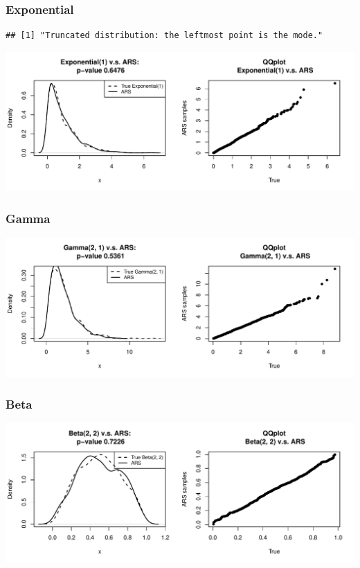 \documentclass{article}\usepackage[]{graphicx}\usepackage[]{color}
\makeatletter
\def\maxwidth{ %
  \ifdim\Gin@nat@width>\linewidth
    \linewidth
  \else
    \Gin@nat@width
  \fi
}
\newenvironment{kframe}{%
 \def\at@end@of@kframe{}%
 \ifinner\ifhmode%
  \def\at@end@of@kframe{\end{minipage}}%
  \begin{minipage}{\columnwidth}%
 \fi\fi%
 \def\FrameCommand##1{\hskip\@totalleftmargin \hskip-\fboxsep
 \colorbox{shadecolor}{##1}\hskip-\fboxsep
     \hskip-\linewidth \hskip-\@totalleftmargin \hskip\columnwidth}%
 \MakeFramed {\advance\hsize-\width
   \@totalleftmargin\z@ \linewidth\hsize
   \@setminipage}}%
 {\par\unskip\endMakeFramed%
 \at@end@of@kframe}
\newenvironment{knitrout}{}{} %
\makeatother
\begin{document}
\subsubsection{Exponential}
\begin{knitrout}
\color{fgcolor}\begin{kframe}
\begin{verbatim}
## [1] "Truncated distribution: the leftmost point is the mode."
\end{verbatim}
\end{kframe}
\includegraphics[width=\maxwidth]{figure/exponential-1} 

\end{knitrout}

\subsubsection{Gamma}
\begin{knitrout}
\color{fgcolor}
\includegraphics[width=\maxwidth]{figure/gamma-1} 

\end{knitrout}

\subsubsection{Beta}
\begin{knitrout}
\color{fgcolor}
\includegraphics[width=\maxwidth]{figure/beta-1} 

\end{knitrout}
\end{document}
